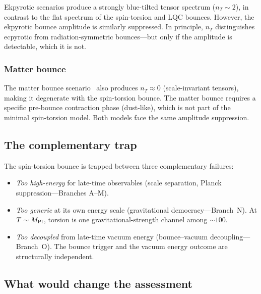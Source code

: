 \documentclass[aps,prd,twocolumn,superscriptaddress,showpacs,preprintnumbers,
  nofootinbib,longbibliography,floatfix]{revtex4-2}
\newcommand{\MPl}{M_{\rm Pl}}
\begin{document}
Ekpyrotic scenarios produce a strongly blue-tilted tensor spectrum
($n_T \sim 2$), in contrast to the flat spectrum of the spin-torsion and
LQC bounces. However, the ekpyrotic bounce amplitude is similarly
suppressed. In principle, $n_T$ distinguishes ecpyrotic from
radiation-symmetric bounces---but only if the amplitude is detectable,
which it is not.

\subsubsection{Matter bounce}

The matter bounce scenario~\cite{Quintin2015,Cai2014} also produces
$n_T \approx 0$ (scale-invariant tensors), making it degenerate with
the spin-torsion bounce. The matter bounce requires a specific
pre-bounce contraction phase (dust-like), which is not part of the
minimal spin-torsion model. Both models face the same amplitude
suppression.

\subsection{The complementary trap}

The spin-torsion bounce is trapped between three complementary failures:
\begin{itemize}[leftmargin=*]
  \item \textit{Too high-energy} for late-time observables (scale
    separation, Planck suppression---Branches A--M).
  \item \textit{Too generic} at its own energy scale (gravitational
    democracy---Branch~N). At $T \sim \MPl$, torsion is one
    gravitational-strength channel among $\sim\!100$.
  \item \textit{Too decoupled} from late-time vacuum energy
    (bounce--vacuum decoupling---Branch~O). The bounce trigger and the
    vacuum energy outcome are structurally independent.
\end{itemize}

\subsection{What would change the assessment}
\end{document}
